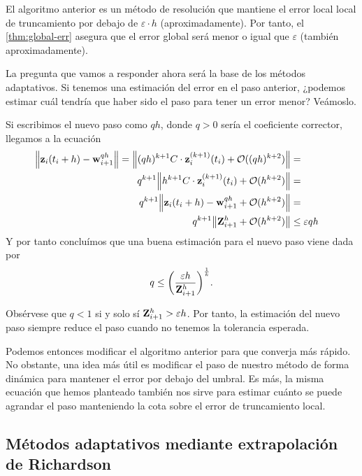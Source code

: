 \begin{remark}
    El algoritmo anterior es un método de resolución
    que mantiene el error local local de truncamiento
    por debajo de $\varepsilon\cdot h$ (aproximadamente).
    Por tanto, el \cref{thm:global-err} asegura que el error global será
    menor o igual que $\varepsilon$ (también aproximadamente).
\end{remark}

La pregunta que vamos a responder ahora será la base de los métodos adaptativos.
Si tenemos una estimación del error en el paso anterior,
¿podemos estimar cuál tendría que haber sido el paso para tener un error menor?
Veámoslo.

Si escribimos el nuevo paso como $qh$, donde $q > 0$ sería el coeficiente corrector,
llegamos a la ecuación
\begin{align*}
    \norm{\vb{z}{}_i(t_i + h) - \vb{w}{}^{qh}_{i+1}} =
    \norm{(qh)^{k+1}C\cdot \vb{z}{}_i^{(k+1)}(t_i) + \vb{\mathcal{O}}{}((qh)^{k+2})} = {} \\
    q^{k+1}\norm{h^{k+1}C\cdot \vb{z}{}_i^{(k+1)}(t_i) + \vb{\mathcal{O}}{}(h^{k+2})} = {} \\
    q^{k+1}\norm{\vb{z}{}_i(t_i + h) - \vb{w}{}^{qh}_{i+1} + \vb{\mathcal{O}}{}(h^{k+2})} = {} \\
    q^{k+1}\norm{\vb{Z}{}^h_{i+1} + \vb{\mathcal{O}}{}(h^{k+2})} \le {} & \varepsilon qh
\end{align*}
Y por tanto concluímos que una buena estimación para el nuevo paso
viene dada por
\begin{equation*}
    q \le \qty(\frac{\varepsilon h}{\vb{Z}{}^h_{i+1}})^{\frac{1}{k}}.
\end{equation*}

\begin{remark}
    Obsérvese que $q < 1$ si y solo sí $\vb{Z}{}^h_{i+1} > \varepsilon h$.
    Por tanto, la estimación del nuevo paso
    siempre reduce el paso cuando no tenemos la tolerancia esperada.
\end{remark}

Podemos entonces modificar el algoritmo anterior
para que converja más rápido.
No obstante, una idea más útil es
modificar el paso de nuestro método de forma dinámica
para mantener el error por debajo del umbral.
Es más, la misma ecuación que hemos planteado también nos sirve
para estimar cuánto se puede agrandar el paso
manteniendo la cota sobre el error de truncamiento local.


\subsection{Métodos adaptativos mediante extrapolación de Richardson}

